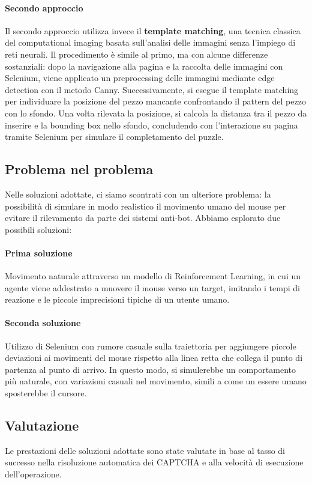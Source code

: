 \documentclass{article}
\begin{document}
\paragraph{Secondo approccio} Il secondo approccio utilizza invece il \textbf{template matching}, una tecnica classica del computational imaging basata sull’analisi delle immagini senza l’impiego di reti neurali. Il procedimento è simile al primo, ma con alcune differenze sostanziali: dopo la navigazione alla pagina e la raccolta delle immagini con Selenium, viene applicato un preprocessing delle immagini mediante edge detection con il metodo Canny. Successivamente, si esegue il template matching per individuare la posizione del pezzo mancante confrontando il pattern del pezzo con lo sfondo. Una volta rilevata la posizione, si calcola la distanza tra il pezzo da inserire e la bounding box nello sfondo, concludendo con l’interazione su pagina tramite Selenium per simulare il completamento del puzzle. 

\subsection{Problema nel problema}
Nelle soluzioni adottate, ci siamo scontrati con un ulteriore problema: la possibilità di simulare in modo realistico il movimento umano del mouse per evitare il rilevamento da parte dei sistemi anti-bot. Abbiamo esplorato due possibili soluzioni:

\paragraph{Prima soluzione} Movimento naturale attraverso un modello di Reinforcement Learning, in cui un agente viene addestrato a muovere il mouse verso un target, imitando i tempi di reazione e le piccole imprecisioni tipiche di un utente umano. 
\paragraph{Seconda soluzione } Utilizzo di Selenium con rumore casuale sulla traiettoria per aggiungere piccole deviazioni ai movimenti del mouse rispetto alla linea retta che collega il punto di partenza al punto di arrivo. In questo modo, si simulerebbe un comportamento più naturale, con variazioni casuali nel movimento, simili a come un essere umano sposterebbe il cursore.

\subsection{Valutazione}
Le prestazioni delle soluzioni adottate sono state valutate in base al tasso di successo nella risoluzione automatica dei CAPTCHA e alla velocità di esecuzione dell’operazione.
\end{document}
